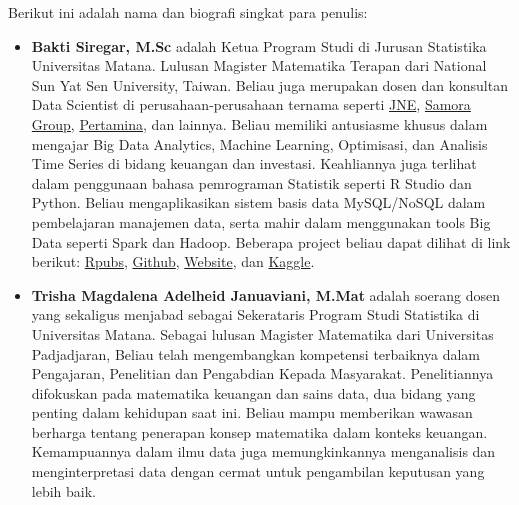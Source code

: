 \documentclass[
]{book}
\providecommand{\tightlist}{%
  \setlength{\itemsep}{0pt}\setlength{\parskip}{0pt}}
\begin{document}
Berikut ini adalah nama dan biografi singkat para penulis:

\begin{itemize}
\tightlist
\item
  \textbf{Bakti Siregar, M.Sc} adalah Ketua Program Studi di Jurusan Statistika Universitas Matana. Lulusan Magister Matematika Terapan dari National Sun Yat Sen University, Taiwan. Beliau juga merupakan dosen dan konsultan Data Scientist di perusahaan-perusahaan ternama seperti \href{https://www.jne.co.id/id/beranda}{JNE}, \href{https://www.samoragroup.co.id/home/en}{Samora Group}, \href{https://www.pertamina.com/}{Pertamina}, dan lainnya. Beliau memiliki antusiasme khusus dalam mengajar Big Data Analytics, Machine Learning, Optimisasi, dan Analisis Time Series di bidang keuangan dan investasi. Keahliannya juga terlihat dalam penggunaan bahasa pemrograman Statistik seperti R Studio dan Python. Beliau mengaplikasikan sistem basis data MySQL/NoSQL dalam pembelajaran manajemen data, serta mahir dalam menggunakan tools Big Data seperti Spark dan Hadoop. Beberapa project beliau dapat dilihat di link berikut: \href{https://rpubs.com/dsciencelabs}{Rpubs}, \href{https://github.com/dsciencelabs}{Github}, \href{https://dsciencelabs.github.io/web/index.html}{Website}, dan \href{https://www.kaggle.com/baktisiregar/code}{Kaggle}.
\end{itemize}

\begin{itemize}
\tightlist
\item
  \textbf{Trisha Magdalena Adelheid Januaviani, M.Mat} adalah soerang dosen yang sekaligus menjabad sebagai Sekerataris Program Studi Statistika di Universitas Matana. Sebagai lulusan Magister Matematika dari Universitas Padjadjaran, Beliau telah mengembangkan kompetensi terbaiknya dalam Pengajaran, Penelitian dan Pengabdian Kepada Masyarakat. Penelitiannya difokuskan pada matematika keuangan dan sains data, dua bidang yang penting dalam kehidupan saat ini. Beliau mampu memberikan wawasan berharga tentang penerapan konsep matematika dalam konteks keuangan. Kemampuannya dalam ilmu data juga memungkinkannya menganalisis dan menginterpretasi data dengan cermat untuk pengambilan keputusan yang lebih baik.
\end{itemize}
\end{document}
